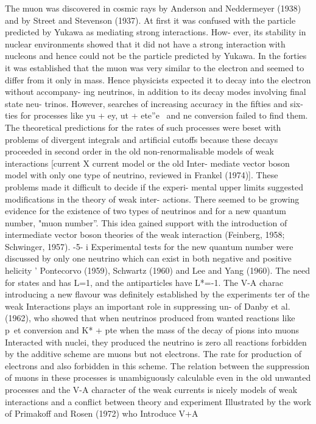 \documentclass[twoside]{article}
\begin{document}
The muon was discovered in cosmic rays by Anderson and Neddermeyer
(1938) and by Street and Stevenson (1937). At first it was confused with
the particle predicted by Yukawa as mediating strong interactions. How-
ever, its stability in nuclear environments showed that it did not have
a strong interaction with nucleons and hence could not be the particle
predicted by Yukawa. In the forties it was established that the muon was
very similar to the electron and seemed to differ from it only in mass.
Hence physicists expected it to decay into the electron without accompany-
ing neutrinos, in addition to its decay modes involving final state neu-
trinos. However, searches of increasing accuracy in the fifties and six-
ties for processes like yu + ey, ut + ete”e~ and ne conversion failed to
find them. The theoretical predictions for the rates of such processes
were beset with problems of divergent integrals and artificial cutoffs
because these decays proceeded in second order in the old non-renormalisable
models of weak interactions [current X current model or the old Inter-
mediate vector boson model with only one type of neutrino, reviewed in
Frankel (1974)]. These problems made it difficult to decide if the experi-
mental upper limits suggested modifications in the theory of weak inter-
actions. There seemed to be growing evidence for the existence of two
types of neutrinos and for a new quantum number, "muon number''. This
idea gained support with the introduction of intermediate vector boson
theories of the weak interaction (Feinberg, 1958; Schwinger, 1957).
 -5- i
Experimental tests for the new quantum number were discussed by only one neutrino which can exist in both negative and positive helicity ’
Pontecorvo (1959), Schwartz (1960) and Lee and Yang (1960). The need for states and has L=1, and the antiparticles have L*=-1. The V-A charac~
introducing a new flavour was definitely established by the experiments ter of the weak Interactions plays an important role in suppressing un-
of Danby et al. (1962), who showed that when neutrinos produced from wanted reactions like p~et conversion and K* + pte
when the mass of
the decay of pions into muons Interacted with nuclei, they produced the neutrino is zero all reactions forbidden by the additive scheme are
muons but not electrons. The rate for production of electrons and also forbidden in this scheme. The relation between the suppression of
muons in these processes is unambiguously calculable even in the old unwanted processes and the V-A character of the weak currents is nicely
models of weak interactions and a conflict between theory and experiment Illustrated by the work of Primakoff and Rosen (1972) who Introduce V+A
\end{document}
